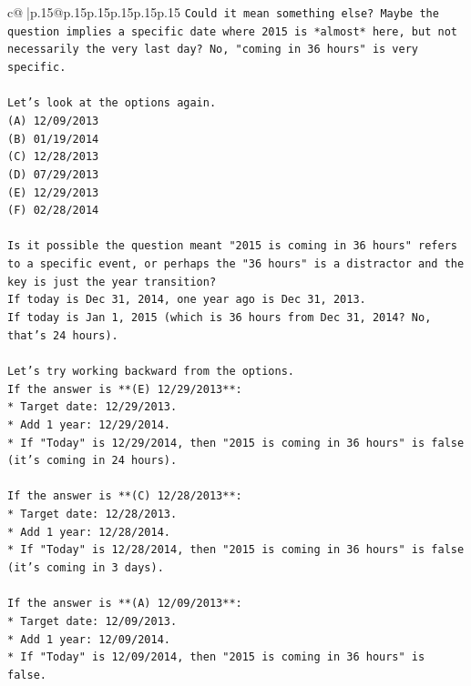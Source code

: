 \documentclass{article}
\begin{document}
{\begin{supertabular}{c@{$\;$}|p{.15\linewidth}@{}p{.15\linewidth}p{.15\linewidth}p{.15\linewidth}p{.15\linewidth}p{.15\linewidth}}
{{{\texttt{Could it mean something else? Maybe the question implies a specific date where 2015 is *almost* here, but not necessarily the very last day? No, "coming in 36 hours" is very specific.} \\
\\ 
\texttt{Let's look at the options again.} \\
\texttt{(A) 12/09/2013} \\
\texttt{(B) 01/19/2014} \\
\texttt{(C) 12/28/2013} \\
\texttt{(D) 07/29/2013} \\
\texttt{(E) 12/29/2013} \\
\texttt{(F) 02/28/2014} \\
\\ 
\texttt{Is it possible the question meant "2015 is coming in 36 hours" refers to a specific event, or perhaps the "36 hours" is a distractor and the key is just the year transition?} \\
\texttt{If today is Dec 31, 2014, one year ago is Dec 31, 2013.} \\
\texttt{If today is Jan 1, 2015 (which is 36 hours from Dec 31, 2014? No, that's 24 hours).} \\
\\ 
\texttt{Let's try working backward from the options.} \\
\texttt{If the answer is **(E) 12/29/2013**:} \\
\texttt{*   Target date: 12/29/2013.} \\
\texttt{*   Add 1 year: 12/29/2014.} \\
\texttt{*   If "Today" is 12/29/2014, then "2015 is coming in 36 hours" is false (it's coming in 24 hours).} \\
\\ 
\texttt{If the answer is **(C) 12/28/2013**:} \\
\texttt{*   Target date: 12/28/2013.} \\
\texttt{*   Add 1 year: 12/28/2014.} \\
\texttt{*   If "Today" is 12/28/2014, then "2015 is coming in 36 hours" is false (it's coming in 3 days).} \\
\\ 
\texttt{If the answer is **(A) 12/09/2013**:} \\
\texttt{*   Target date: 12/09/2013.} \\
\texttt{*   Add 1 year: 12/09/2014.} \\
\texttt{*   If "Today" is 12/09/2014, then "2015 is coming in 36 hours" is false.} \\
}}}
\end{supertabular}}
\end{document}
